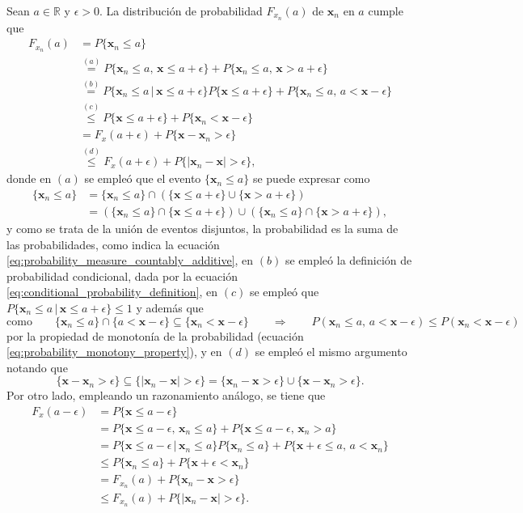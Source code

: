\documentclass[a4paper]{report}
\newcommand{\x}{\mathbf{x}}
\begin{document}
Sean \(a\in\mathbb{R}\) y \(\epsilon>0\). La distribución de probabilidad \(F_{x_n}(a)\) de \(\x_n\) en \(a\) cumple que
\begin{align*}
 F_{x_n}(a)&=P\{\x_n\leq a\}\\
   &\overset{(a)}{=}P\{\x_n\leq a,\,\x\leq a+\epsilon\}+P\{\x_n\leq a,\,\x> a+\epsilon\}\\
   &\overset{(b)}{=}P\{\x_n\leq a\,|\,\x\leq a+\epsilon\}P\{\x\leq a+\epsilon\}+P\{\x_n\leq a,\,a< \x-\epsilon\}\\
   &\overset{(c)}{\leq}P\{\x\leq a+\epsilon\}+P\{\x_n<\x-\epsilon\}\\
   &=F_x(a+\epsilon)+P\{\x-\x_n>\epsilon\}\\
   &\overset{(d)}{\leq}F_x(a+\epsilon)+P\{|\x_n-\x|>\epsilon\},
\end{align*}
donde en \((a)\) se empleó que el evento \(\{\x_n\leq a\}\) se puede expresar como
\begin{align*}
 \{\x_n\leq a\}&=\{\x_n\leq a\}\cap\left(\{\x\leq a+\epsilon\}\cup\{\x> a+\epsilon\}\right)\\
   &=\left(\{\x_n\leq a\}\cap\{\x\leq a+\epsilon\}\right)\cup\left(\{\x_n\leq a\}\cap\{\x> a+\epsilon\}\right),
\end{align*}
y como se trata de la unión de eventos disjuntos, la probabilidad es la suma de las probabilidades, como indica la ecuación \ref{eq:probability_measure_countably_additive}, en \((b)\) se empleó la definición de probabilidad condicional, dada por la ecuación \ref{eq:conditional_probability_definition}, en \((c)\) se empleó que \(P\{\x_n\leq a\,|\,\x\leq a+\epsilon\}\leq1\) y además que
\[
 \textrm{como}\qquad\{\x_n\leq a\}\cap\{a<\x-\epsilon\}\subseteq\{\x_n<\x-\epsilon\}
 \qquad\Rightarrow\qquad
 P(\x_n\leq a,\,a< \x-\epsilon)\leq P(\x_n<\x-\epsilon)
\]
por la propiedad de monotonía de la probabilidad (ecuación \ref{eq:probability_monotony_property}), y en \((d)\) se empleó el mismo argumento notando que
\[
 \{\x-\x_n>\epsilon\}\subseteq\{|\x_n-\x|>\epsilon\}=\{\x_n-\x>\epsilon\}\cup\{\x-\x_n>\epsilon\}.
\]
Por otro lado, empleando un razonamiento análogo, se tiene que
\begin{align*}
 F_x(a-\epsilon)&=P\{\x\leq a-\epsilon\}\\
   &=P\{\x\leq a-\epsilon,\,\x_n\leq a\}+P\{\x\leq a-\epsilon,\,\x_n> a\}\\
   &=P\{\x\leq a-\epsilon\,|\,\x_n\leq a\}P\{\x_n\leq a\}+P\{\x+\epsilon\leq a,\,a<\x_n\}\\
   &\leq P\{\x_n\leq a\}+P\{\x+\epsilon<\x_n\}\\
   &=F_{x_n}(a)+P\{\x_n-\x>\epsilon\}\\
   &\leq F_{x_n}(a)+P\{|\x_n-\x|>\epsilon\}.
\end{align*}
\end{document}
